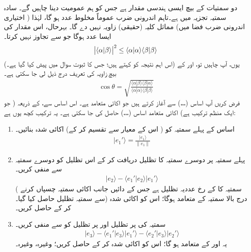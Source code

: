 دو  سمتیات کے بیچ    ایسی    ہندسی مقدار  ہے جس کو ہم عمومیت دینا چاہیں گے۔ سادہ سمتیہ تجزیہ میں 
  ہے۔تاہم    اندرونی ضرب  عموماً مخلوط عدد ہو گا،    لہٰذا  (  اختیاری اندرونی ضرب فضا میں) مماثل کلیہ  (حقیقی)  زاویہ  نہیں دے گا۔ بہرحال،  اس مقدار کی    ایسا  عدد ہوگا جو  سے تجاوز نہیں کرتا۔  
\begin{align}\label{مساوات_ضمیمہ_شوارز_عدم_مساوات}
	\abs{\langle\alpha|\beta\rangle}^2\leq\langle\alpha|\alpha\rangle\langle\beta|\beta\rangle
\end{align}
(اس اہم نتیجہ کو   کہتے ہیں؛  جس کا ثبوت سوال  میں پیش کیا گیا ہے۔)  یوں،  آپ چاہیں تو،   اور  کے بیچ زاویہ کی  تعریف درج ذیل  لی جا سکتی ہے۔
\begin{align}\label{مساوات_ضمیمہ_زاویہ}
	\cos\theta = \sqrt{\frac{\langle\alpha|\beta\rangle\langle\beta|\alpha\rangle}{\langle\alpha|\alpha\rangle\langle\beta|\beta\rangle}}
\end{align}
فرض کریں آپ اساس (،،،)  سے آغاز کرتے ہیں جو اکائی متعامد  ہے۔ اس اساس سے،    کے ذریعہ ( جو ایک منظم ترکیب ہے)      اکائی متعامد اساس (،،،)    حاصل کی جا سکتی ہے۔ یہ ترکیب  کچھ یوں ہے:
\begin{enumerate}[a]
\item
  اساس کے پہلے سمتیہ   کو  ( اس کے معیار سے تقسیم کر کے)   اکائی شدہ  بنائیں۔
\begin{align*}
		|e_1'\rangle = \frac{|e_1\rangle}{\|e_1\|}
\end{align*}
\item
 پہلے سمتیہ پر دوسرے سمتیہ کا تظلیل  دریافت کر کے اس تظلیل کو دوسرے سمتیہ سے منفی کریں۔
\begin{align*}
	|e_2\rangle-\langle e_1'|e_2\rangle|e_1'\rangle
\end{align*}
( سمتیہ  کا  کے رخ عددیہ تظلیل   ہے جس کے دائیں جانب اکائی سمتیہ   چسپاں کرنے سے سمتیہ تظلیل حاصل  کیا گیا۔) درج بالا  سمتیہ  کے متعامد ہوگا؛ اس کو اکائی شدہ  کر کے  حاصل کریں۔
\item
سمتیہ   کی  پر تظلیل  اور  پر تظلیل کو  سے منفی کریں۔
\begin{align*}
|e_3\rangle-\langle e_1'|e_3\rangle|e_1'\rangle-\langle e_2'|e_3\rangle|e_2'\rangle
\end{align*}
یہ  اور  کے متعامد ہو گا؛ اس کو اکائی شدہ کر کے  حاصل کریں؛ وغیرہ، وغیرہ۔
\end{enumerate}

